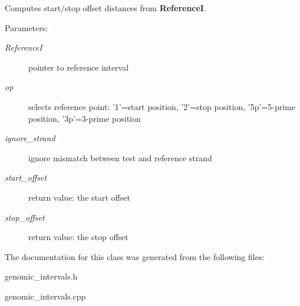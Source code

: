 Computes start/stop offset distances from {\bf ReferenceI}. 

\begin{Desc}
\item[Parameters:]
\begin{description}
\item[{\em ReferenceI}]pointer to reference interval \item[{\em op}]selects reference point: '1'=start position, '2'=stop position, '5p'=5-prime position, '3p'=3-prime position \item[{\em ignore\_\-strand}]ignore mismatch between test and reference strand \item[{\em start\_\-offset}]return value: the start offset \item[{\em stop\_\-offset}]return value: the stop offset \end{description}
\end{Desc}


The documentation for this class was generated from the following files:\begin{CompactItemize}
\item 
genomic\_\-intervals.h\item 
genomic\_\-intervals.cpp\end{CompactItemize}
